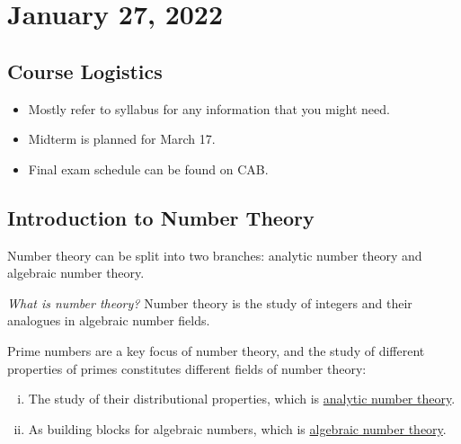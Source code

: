 \setcounter{section}{-1}
\section{January 27, 2022}
\subsection{Course Logistics}
\begin{itemize}
    \item Mostly refer to syllabus for any information that you might need.
    \item Midterm is planned for March 17.
    \item Final exam schedule can be found on CAB.
\end{itemize}

\subsection{Introduction to Number Theory}
Number theory can be split into two branches: analytic number theory and algebraic number theory.

\emph{What is number theory?} Number theory is the study of integers and their analogues in algebraic number fields.

Prime numbers are a key focus of number theory, and the study of different properties of primes constitutes different fields of number theory:
\begin{enumerate}[i.]
    \item The study of their distributional properties, which is \ul{analytic number theory}.
    \item As building blocks for algebraic numbers, which is \ul{algebraic number theory}.
\end{enumerate}

